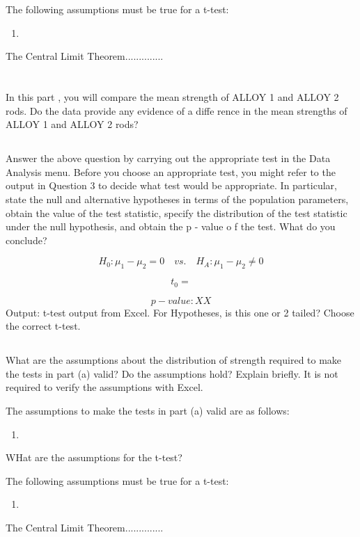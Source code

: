 \documentclass[letterpaper]{article}
\begin{document}
The following assumptions must be true for a t-test:
\begin{enumerate}
 \item
\end{enumerate}
The Central Limit Theorem..............

\section{}%
In this part , you will compare the mean strength of ALLOY 1 and ALLOY 2 rods.
Do the data provide  any evidence of a diffe rence in the mean strengths of
ALLOY 1 and ALLOY 2 rods?

\subsection{}%
Answer the above question by carrying out the appropriate test in the Data
Analysis menu. Before  you choose an appropriate test, you might refer to the
output in Question  3 to decide  what test would be appropriate.  In particular,
state the null and alternative hypotheses in terms of the  population
parameters, obtain the value of the test statistic, specify the distribution of
the test statistic  under the null hypothesis, and obtain the  p - value o f the
test. What do you conclude?

$$H_0: \mu_1 - \mu_2 =0  \quad vs. \quad H_A: \mu_1 - \mu_2 \neq 0  $$

$$t_0 =$$

$$ {p-value}: XX $$
Output: t-test output from Excel. For Hypotheses, is this one or 2 tailed?
Choose the correct t-test.

\subsection{}%
What are the assumptions about the distribution of strength required to make the
tests in part (a) valid?  Do the assumptions hold?  Explain briefly. It is not
required to verify the assumptions with Excel.

The assumptions to make the tests in part (a) valid are as follows:

\begin{enumerate}
 \item
\end{enumerate}

WHat are the assumptions for the t-test?

The following assumptions must be true for a t-test:
\begin{enumerate}
 \item
\end{enumerate}
The Central Limit Theorem..............
\end{document}
